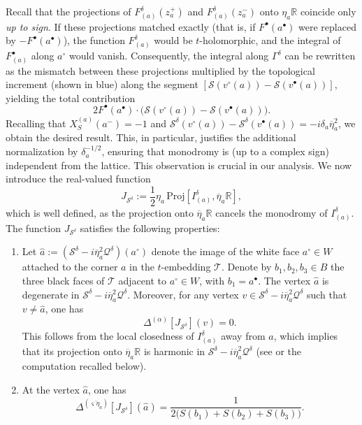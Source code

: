 \documentclass[reqno]{amsart}
\numberwithin{equation}{section}
\theoremstyle{definition}
\theoremstyle{remark}
\newcommand\cS{\mathcal{S}}
\newcommand\cT{\mathcal{T}}
\begin{document}
Recall that the projections of $F^{\delta}_{(a)}(z_a^{+})$ and $F^{\delta}_{(a)}(z_a^{-})$ onto $\eta_a \mathbb{R}$ coincide only \emph{up to sign}. If these projections matched exactly (that is, if $F^{\bullet}(a^\bullet)$ were replaced by $-F^{\bullet}(a^\bullet)$), the function $F^{\delta}_{(a)}$ would be $t$-holomorphic, and the integral of $F^\bullet_{(a)}$ along $a^\circ$ would vanish. Consequently, the integral along $\Gamma^\delta$ can be rewritten as the mismatch between these projections multiplied by the topological increment (shown in blue) along the segment $[\cS(v^\circ(a)) - \cS(v^\bullet(a))]$, yielding the total contribution
\begin{equation}
    2 F^{\bullet}(a^\bullet)
    \cdot \big( \cS(v^{\circ}(a)) - \cS(v^{\bullet}(a)) \big).
\end{equation}
Recalling that $X_{S}^{(a)}(a^-) = -1$ and $\mathcal{S}^\delta(v^{\circ}(a)) - \mathcal{S}^\delta(v^{\bullet}(a)) = -i \delta_a \overline{\eta}_a^2$, we obtain the desired result. This, in particular, justifies the additional normalization by $\delta_a^{-1/2}$, ensuring that monodromy is (up to a complex sign) independent from the lattice. This observation is crucial in our analysis. We now introduce the real-valued function
\begin{equation}\label{eq:def-J_S}
	    J_{\cS^\delta} := \frac{1}{2}\eta_a \, \mathrm{Proj}[I^{\delta}_{(a)}, \overline{\eta}_a \mathbb{R}],
\end{equation}
which is well defined, as the projection onto $\overline{\eta}_a \mathbb{R}$ cancels the monodromy of $I^{\delta}_{(a)}$. The function $J_{\cS^\delta}$ satisfies the following properties:
\begin{enumerate}
    \item Let $\hat{a} := (\mathcal{S}^\delta - i\overline{\eta}_a^2 \mathcal{Q}^\delta)(a^\circ)$ denote the image of the white face $a^\circ \in W$ attached to the corner $a$ in the $t$-embedding $\cT$. Denote by $b_1, b_2, b_3 \in B$ the three black faces of $\cT$ adjacent to $a^\circ \in W$, with $b_1 = a^\bullet$. The vertex $\hat{a}$ is degenerate in $\mathcal{S}^\delta - i\overline{\eta}_a^2 \mathcal{Q}^\delta$. Moreover, for any vertex $v \in \mathcal{S}^\delta - i\overline{\eta}_a^2 \mathcal{Q}^\delta$ such that $v \neq \hat{a}$, one has
    \[
        \Delta^{(\alpha)}[J_{\cS^\delta}](v) = 0.
    \]
    This follows from the local closedness of $I^{\delta}_{(a)}$ away from $a$, which implies that its projection onto $\overline{\eta}_a \mathbb{R}$ is harmonic in $\mathcal{S}^\delta - i\overline{\eta}_a^2 \mathcal{Q}^\delta$ (see \cite[Proposition~4.15]{CLR1} or the computation recalled below).

    \item At the vertex $\hat{a}$, one has
    \[
        \Delta^{(\overline{\varsigma \eta_a})}[J_{\cS^\delta}](\hat{a})
        = \frac{1}{2\big(S(b_1) + S(b_2) + S(b_3)\big)}.
    \]
\end{enumerate}
\end{document}
